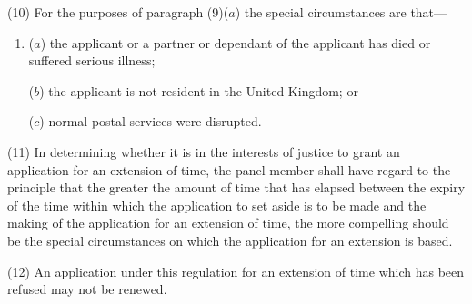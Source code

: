 \documentclass[12pt,a4paper]{article}
\begin{document}
(10) For the purposes of paragraph (9)($a$)  the special circumstances are that—
\begin{enumerate}\item[]
($a$) the applicant or a partner or dependant of the applicant has died or suffered serious illness;

($b$) the applicant is not resident in the United Kingdom; or

($c$) normal postal services were disrupted.
\end{enumerate}

(11) In determining whether it is in the interests of justice to grant an application for an extension of time, the panel member shall have regard to the principle that the greater the amount of time that has elapsed between the expiry of the time within which the application to set aside is to be made and the making of the application for an extension of time, the more compelling should be the special circumstances on which the application for an extension is based.

(12) An application under this regulation for an extension of time which has been refused may not be renewed.


%
%
%
\end{document}
